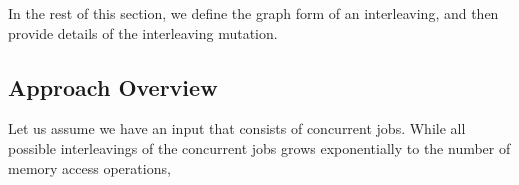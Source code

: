 In the rest of this section, we define the graph form of an
interleaving, and then provide details of the interleaving mutation.




\subsection{Approach Overview}
\label{ss:overview}

Let us assume we have an input that consists of concurrent jobs.
%
While all possible interleavings of the concurrent jobs grows
exponentially to the number of memory access operations,






